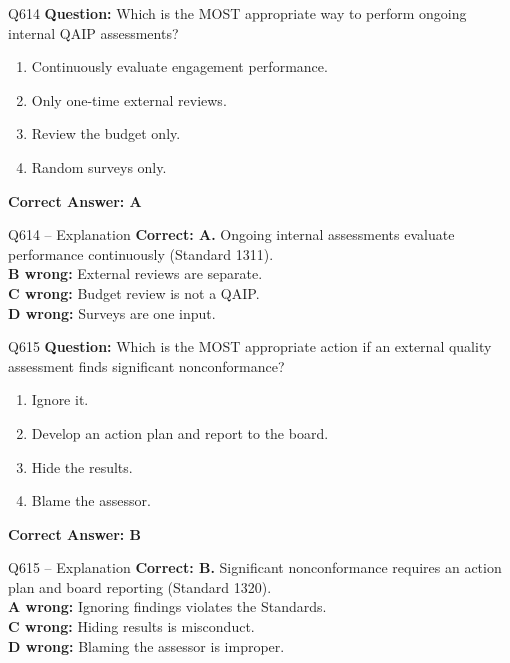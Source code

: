 \documentclass[aspectratio=169,10pt]{beamer}
\begin{document}
	\begin{frame}[t]{Q614}
		\small
		\textbf{Question:} Which is the MOST appropriate way to perform ongoing internal QAIP assessments?
		\begin{enumerate}[label=\Alph*.,itemsep=1pt,topsep=2pt]
			\item Continuously evaluate engagement performance.
			\item Only one-time external reviews.
			\item Review the budget only.
			\item Random surveys only.
		\end{enumerate}
		\vspace{4pt}
		\textbf{Correct Answer: A}
	\end{frame}
	
	\begin{frame}[t]{Q614 -- Explanation}
		\small
		\textbf{Correct: A.} Ongoing internal assessments evaluate performance continuously (Standard 1311). \\[4pt]
		\textbf{B wrong:} External reviews are separate. \\[2pt]
		\textbf{C wrong:} Budget review is not a QAIP. \\[2pt]
		\textbf{D wrong:} Surveys are one input.
	\end{frame}
	
	\begin{frame}[t]{Q615}
		\small
		\textbf{Question:} Which is the MOST appropriate action if an external quality assessment finds significant nonconformance?
		\begin{enumerate}[label=\Alph*.,itemsep=1pt,topsep=2pt]
			\item Ignore it.
			\item Develop an action plan and report to the board.
			\item Hide the results.
			\item Blame the assessor.
		\end{enumerate}
		\vspace{4pt}
		\textbf{Correct Answer: B}
	\end{frame}
	
	\begin{frame}[t]{Q615 -- Explanation}
		\small
		\textbf{Correct: B.} Significant nonconformance requires an action plan and board reporting (Standard 1320). \\[4pt]
		\textbf{A wrong:} Ignoring findings violates the Standards. \\[2pt]
		\textbf{C wrong:} Hiding results is misconduct. \\[2pt]
		\textbf{D wrong:} Blaming the assessor is improper.
	\end{frame}
	
\end{document}
